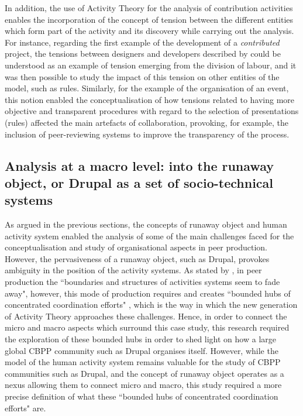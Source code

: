 In addition, the use of Activity Theory for the analysis of contribution activities enables the incorporation of the concept of tension between the different entities which form part of the activity and its discovery while carrying out the analysis. For instance, regarding the first example of the development of a \textit{contributed} project, the tensions between designers and developers described by \textcite{Zilouchian2011} could be understood as an example of tension emerging from the division of labour, and it was then possible to study the impact of this tension on other entities of the model, such as rules. Similarly, for the example of the organisation of an event, this notion enabled the conceptualisation of how tensions related to having more objective and transparent procedures with regard to the selection of presentations (rules) affected the main artefacts of collaboration, provoking, for example, the inclusion of peer-reviewing systems to improve the transparency of the process.

\subsection{Analysis at a macro level: into the runaway object, or Drupal as a set of socio-technical systems}

As argued in the previous sections, the concepts of runaway object and human activity system enabled the analysis of some of the main challenges faced for the conceptualisation and study of organisational aspects in peer production. However, the pervasiveness \parencite[304-306]{engestrom_future_2009} of a runaway object, such as Drupal, provokes ambiguity in the position of the activity systems. As stated by \textcite[309]{engestrom_future_2009}, in peer production the ``boundaries and structures of activities systems seem to fade away", however, this mode of production requires and creates ``bounded hubs of concentrated coordination efforts" \parencite[310]{engestrom_future_2009}, which is the way in which the new generation of Activity Theory approaches these challenges. Hence, in order to connect the micro and macro aspects which surround this case study, this research required the exploration of these bounded hubs in order to shed light on how a large global CBPP community such as Drupal organises itself. However, while the model of the human activity system remains valuable for the study of CBPP communities such as Drupal, and the concept of runaway object operates as a nexus allowing them to connect micro and macro, this study required a more precise definition of what these ``bounded hubs of concentrated coordination efforts" are.

